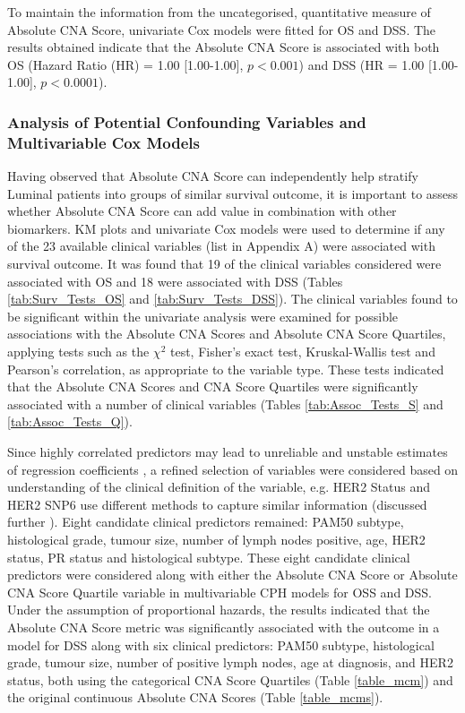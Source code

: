 To maintain the information from the uncategorised, quantitative measure of Absolute CNA Score, univariate Cox models were fitted for OS and DSS. The results obtained indicate that the Absolute CNA Score is associated with both OS (Hazard Ratio (HR) = 1.00 [1.00-1.00], $p < 0.001$) and DSS (HR = 1.00 [1.00-1.00], $p < 0.0001$).

\subsubsection{Analysis of Potential Confounding Variables and Multivariable Cox Models}
Having observed that Absolute CNA Score can independently help stratify Luminal patients into groups of similar survival outcome, it is important to assess whether Absolute CNA Score can add value in combination with other biomarkers. KM plots and univariate Cox models were used to determine if any of the 23 available clinical variables (list in Appendix A) were associated with survival outcome. It was found that 19 of the clinical variables considered were associated with OS and 18 were associated with DSS (Tables \ref{tab:Surv_Tests_OS} and \ref{tab:Surv_Tests_DSS}). The clinical variables found to be significant within the univariate analysis were examined for possible associations with the Absolute CNA Scores and Absolute CNA Score Quartiles, applying tests such as the $\chi^2$ test, Fisher’s exact test, Kruskal-Wallis test and Pearson's correlation, as appropriate to the variable type. These tests indicated that the Absolute CNA Scores and CNA Score Quartiles were significantly associated with a number of clinical variables (Tables \ref{tab:Assoc_Tests_S} and \ref{tab:Assoc_Tests_Q}).

Since highly correlated predictors may lead to unreliable and unstable estimates of regression coefficients \citep{Keith_2019}, a refined selection of variables were considered based on understanding of the clinical definition of the variable, e.g. HER2 Status and HER2 SNP6 use different methods to capture similar information (discussed further \cite{King_2021}). Eight candidate clinical predictors remained: PAM50 subtype, histological grade, tumour size, number of lymph nodes positive, age, HER2 status, PR status and histological subtype. These eight candidate clinical predictors were considered along with either the Absolute CNA Score or Absolute CNA Score Quartile variable in multivariable CPH models for OSS and DSS. Under the assumption of proportional hazards, the results indicated that the Absolute CNA Score metric was significantly associated with the outcome in a model for DSS along with six clinical predictors: PAM50 subtype, histological grade, tumour size, number of positive lymph nodes, age at diagnosis, and HER2 status, both using the categorical CNA Score Quartiles (Table \ref{table_mcm}) and the original continuous Absolute CNA Scores (Table \ref{table_mcms}). 

